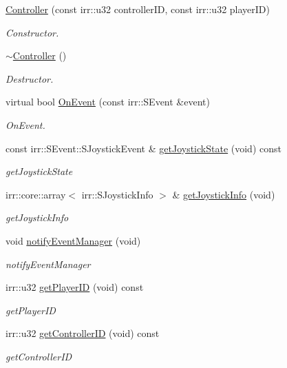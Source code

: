 \begin{DoxyCompactItemize}
\item 
\hyperlink{classController_ac4a14971762c0d091606211711762273}{Controller} (const irr\+::u32 controller\+ID, const irr\+::u32 player\+ID)
\begin{DoxyCompactList}\small\item\em Constructor. \end{DoxyCompactList}\item 
\hyperlink{classController_a0ab87934c4f7a266cfdb86e0f36bc1b5}{$\sim$\+Controller} ()
\begin{DoxyCompactList}\small\item\em Destructor. \end{DoxyCompactList}\item 
virtual bool \hyperlink{classController_a81b6f6d728022c92b064866759a7d4d9}{On\+Event} (const irr\+::\+S\+Event \&event)
\begin{DoxyCompactList}\small\item\em On\+Event. \end{DoxyCompactList}\item 
const irr\+::\+S\+Event\+::\+S\+Joystick\+Event \& \hyperlink{classController_a43d5202e40ae827029fdca587d0bfeab}{get\+Joystick\+State} (void) const
\begin{DoxyCompactList}\small\item\em get\+Joystick\+State \end{DoxyCompactList}\item 
irr\+::core\+::array$<$ irr\+::\+S\+Joystick\+Info $>$ \& \hyperlink{classController_a1d628add26120f35d2dc53eabaa34d4b}{get\+Joystick\+Info} (void)
\begin{DoxyCompactList}\small\item\em get\+Joystick\+Info \end{DoxyCompactList}\item 
void \hyperlink{classController_a3e855bf7e018e2659ecb3d0e13a7f39c}{notify\+Event\+Manager} (void)
\begin{DoxyCompactList}\small\item\em notify\+Event\+Manager \end{DoxyCompactList}\item 
irr\+::u32 \hyperlink{classController_a76891bd0871480c92f45c597c3eddf93}{get\+Player\+ID} (void) const
\begin{DoxyCompactList}\small\item\em get\+Player\+ID \end{DoxyCompactList}\item 
irr\+::u32 \hyperlink{classController_ab2294a9b730b80216705b7e9ae36a5bd}{get\+Controller\+ID} (void) const
\begin{DoxyCompactList}\small\item\em get\+Controller\+ID \end{DoxyCompactList}\end{DoxyCompactItemize}


